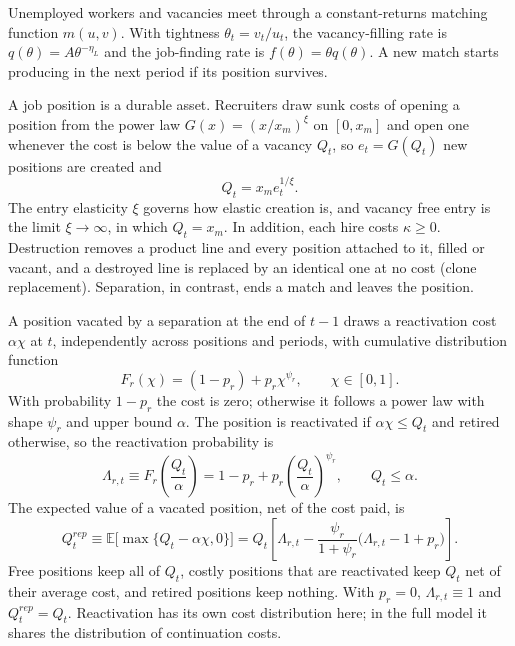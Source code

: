 \documentclass[authoryear, review, 12pt]{elsarticle}
\newcommand{\E}{\mathbb{E}}
\begin{document}
Unemployed workers and vacancies meet through a constant-returns matching function $m(u,v)$. With tightness $\theta_t=v_t/u_t$, the vacancy-filling rate is $q(\theta)=A\theta^{-\eta_L}$ and the job-finding rate is $f(\theta)=\theta q(\theta)$. A new match starts producing in the next period if its position survives.

A job position is a durable asset. Recruiters draw sunk costs of opening a position from the power law $G(x)=(x/x_m)^{\xi}$ on $[0,x_m]$ and open one whenever the cost is below the value of a vacancy $Q_t$, so $e_t=G(Q_t)$ new positions are created and
\begin{equation}\label{eq:Q}
Q_t = x_m e_t^{1/\xi}.
\end{equation}
The entry elasticity $\xi$ governs how elastic creation is, and vacancy free entry is the limit $\xi\to\infty$, in which $Q_t=x_m$. In addition, each hire costs $\kappa\ge0$. Destruction removes a product line and every position attached to it, filled or vacant, and a destroyed line is replaced by an identical one at no cost (clone replacement). Separation, in contrast, ends a match and leaves the position.

A position vacated by a separation at the end of $t-1$ draws a reactivation cost $\alpha\chi$ at $t$, independently across positions and periods, with cumulative distribution function
\begin{equation}
F_r(\chi) = (1-p_r) + p_r\chi^{\psi_r},\qquad \chi\in[0,1].
\end{equation}
With probability $1-p_r$ the cost is zero; otherwise it follows a power law with shape $\psi_r$ and upper bound $\alpha$. The position is reactivated if $\alpha\chi\le Q_t$ and retired otherwise, so the reactivation probability is
\begin{equation}\label{eq:Lambda_r}
\Lambda_{r,t} \equiv F_r\!\left(\frac{Q_t}{\alpha}\right) = 1-p_r+p_r\left(\frac{Q_t}{\alpha}\right)^{\psi_r},\qquad Q_t\le\alpha.
\end{equation}
The expected value of a vacated position, net of the cost paid, is
\begin{equation}\label{eq:Qrep}
Q_t^{rep}\equiv\E\big[\max\{Q_t-\alpha\chi,0\}\big] = Q_t\left[\Lambda_{r,t}-\frac{\psi_r}{1+\psi_r}\big(\Lambda_{r,t}-1+p_r\big)\right].
\end{equation}
Free positions keep all of $Q_t$, costly positions that are reactivated keep $Q_t$ net of their average cost, and retired positions keep nothing. With $p_r=0$, $\Lambda_{r,t}\equiv1$ and $Q_t^{rep}=Q_t$. Reactivation has its own cost distribution here; in the full model it shares the distribution of continuation costs.
\end{document}
